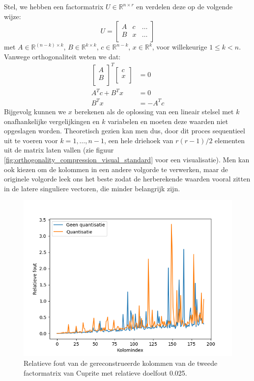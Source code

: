 Stel, we hebben een factormatrix $U \in \mathbb{R}^{n \times r}$ en verdelen deze op de volgende wijze:
\[
U = \begin{bmatrix}
A & c & \dots \\
B & x & \dots \\
\end{bmatrix}
\]
met $A \in \mathbb{R}^{(n-k) \times k}$, $B \in \mathbb{R}^{k \times k}$, $c \in \mathbb{R}^{n-k}$, $x \in \mathbb{R}^{k}$, voor willekeurige $1 \leq k < n$. Vanwege orthogonaliteit weten we dat:
\begin{align*}
\begin{bmatrix}
A \\
B \\
\end{bmatrix}^T
\begin{bmatrix}
c \\
x \\
\end{bmatrix}
&= 0 \\
A^T c + B^T x &= 0 \\
B^T x &= -A^T c
\end{align*}
Bijgevolg kunnen we $x$ berekenen als de oplossing van een lineair stelsel met $k$ onafhankelijke vergelijkingen en $k$ variabelen en moeten deze waarden niet opgeslagen worden. Theoretisch gezien kan men dus, door dit proces sequentieel uit te voeren voor $k = 1, \dots, n - 1$, een hele driehoek van $r (r - 1)/2$ elementen uit de matrix laten vallen (zie figuur \ref{fig:orthogonality_compression_visual_standard} voor een visualisatie). Men kan ook kiezen om de kolommen in een andere volgorde te verwerken, maar de originele volgorde leek ons het beste zodat de herberekende waarden vooral zitten in de latere singuliere vectoren, die minder belangrijk zijn.\\

\begin{figure}[]
  \centering
  \includegraphics[scale=0.7]{images/orthogonality_compression_basic.png}
  \caption{Relatieve fout van de gereconstrueerde kolommen van de tweede factormatrix van Cuprite met relatieve doelfout 0.025.}
\label{fig:orthogonality-compression-basic}
\end{figure}

